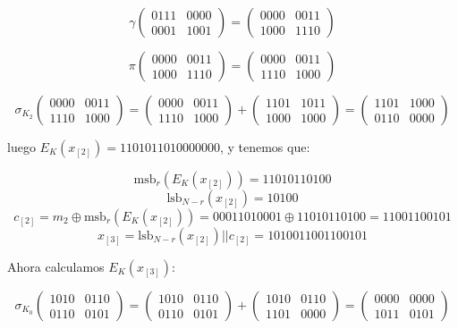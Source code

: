 \documentclass[a4paper]{article}
\begin{document}
$$\gamma \begin{pmatrix} 0111 & 0000 \\ 0001 & 1001 \end{pmatrix} = \begin{pmatrix} 0000 & 0011 \\ 1000 & 1110 \end{pmatrix}$$

$$\pi \begin{pmatrix} 0000 & 0011 \\ 1000 & 1110 \end{pmatrix} = \begin{pmatrix} 0000 & 0011 \\ 1110 & 1000 \end{pmatrix}$$

$$\sigma_{K_2} \begin{pmatrix} 0000 & 0011 \\ 1110 & 1000 \end{pmatrix} = \begin{pmatrix} 0000 & 0011 \\ 1110 & 1000 \end{pmatrix} + \begin{pmatrix} 1101 & 1011 \\ 1000 & 1000 \end{pmatrix} = \begin{pmatrix} 1101 & 1000 \\ 0110 & 0000 \end{pmatrix}$$

luego $E_K(x_{[2]}) = 1101 0110 1000 0000$, y tenemos que:

$$\text{msb}_r (E_K(x_{[2]})) = 1101 0110 100$$
$$\text{lsb}_{N-r} (x_{[2]}) = 10100$$
$$c_{[2]} = m_2 \oplus \text{msb}_r(E_K(x_{[2]})) = 0 0011 0100 01 \oplus 1101 0110 100 = 1100 1100 101$$
$$x_{[3]} = \text{lsb}_{N-r} (x_{[2]}) || c_{[2]} = 1010 0110 0110 0101$$

Ahora calculamos $E_K(x_{[3]})$:

$$\sigma_{K_0} \begin{pmatrix} 1010 & 0110 \\ 0110 & 0101 \end{pmatrix} = \begin{pmatrix} 1010 & 0110 \\ 0110 & 0101 \end{pmatrix} + \begin{pmatrix} 1010 & 0110 \\ 1101 & 0000 \end{pmatrix} = \begin{pmatrix} 0000 & 0000 \\ 1011 & 0101 \end{pmatrix}$$
\end{document}
